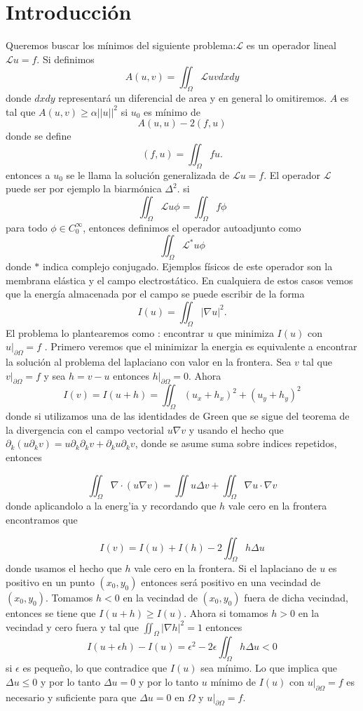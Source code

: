 \documentclass[a4paper,10pt]{book}
\begin{document}
\section{Introducci\'on}
Queremos buscar los m\'inimos del siguiente problema:$\mathscr{L}$ es un operador lineal
$\mathscr{L} u=f$.   Si definimos
\[A(u,v)=\iint_{\Omega} \mathscr{L} u v  dx dy \] 
donde $dx dy$ representar\'a un diferencial de area y en general lo omitiremos.
$A$ es tal que $A(u,v)\geq \alpha {|| u ||}^2$ si  $u_0$ es m\'inimo de 
\[A(u,u)-2 (f,u) \]
donde se define
\[(f,u)=\iint_{\Omega} f u .\]
entonces a $u_0$ se le llama la soluci\'on generalizada de $\mathscr{L} u=f$. El operador $\mathscr{L}$ puede ser 
por ejemplo la  biarm\'onica $\Delta^2$.
si
\[\iint_{\Omega} \mathscr{L} u\phi =\iint_{\Omega} f \phi  \]
para todo $\phi \in C_0^\infty$, entonces definimos el operador autoadjunto como 
\[\iint_{\Omega} \mathscr{L}^{*} u\phi \]
donde $*$ indica complejo conjugado. Ejemplos f\'isicos de este operador son 
la membrana el\'astica y el campo electrost\'atico. En cualquiera de estos casos
vemos que la energ\'ia almacenada por el campo se puede escribir de la forma
\[I(u)=\iint_{\Omega} |\nabla u |^2  .\]
El problema lo plantearemos como : encontrar $u$  que minimiza $I(u)$ con $u|_{\partial \Omega}=f$ .
Primero veremos que el minimizar la energia es equivalente a encontrar la soluci\'on al problema 
del laplaciano con valor en la frontera. Sea $v$ tal que $v|_{\partial \Omega}=f$ y sea
$h=v-u$ entonces $h|_{\partial \Omega}=0$. Ahora
\[I(v)= I(u+h)=  \iint_{\Omega} (u_x +h_x)^2+(u_y+h_y)^2  \]
donde si utilizamos una de las identidades de Green que se sigue del teorema de la divergencia con 
el campo vectorial $u \nabla v $ y usando el hecho que $\partial_{k}(u\partial_k v)=u \partial _k \partial _k v+  \partial _k u \partial _k v$,
donde se asume  suma sobre indices repetidos, entonces

\[\iint_{\Omega} \nabla \cdot (u \nabla v)   =\iint u \Delta v + \iint_\Omega \nabla u\cdot\nabla v \]
donde  aplicandolo a la energ'ia y recordando que $h$ vale cero en la frontera encontramos que

\[I(v)=I(u)+I(h)-2\iint_{\Omega} h \Delta u  \] 
donde usamos el hecho que $h$ vale cero en la frontera. Si el laplaciano de $u$ es positivo en un punto $(x_0,y_0)$
entonces ser\'a positivo en una vecindad de $(x_0,y_0)$.  Tomamos $h<0$ en la vecindad de $(x_0,y_0)$
fuera de dicha vecindad, entonces se tiene que $I(u+h)\geq I(u)$. Ahora si tomamos
$h>0$ en la vecindad y cero fuera y tal que $\iint_{\Omega} |\nabla h|^2 =1$   entonces
\[I(u+\epsilon h)-I(u)= \epsilon^2-2\epsilon \iint_{\Omega} h \Delta u <0\]
si $ \epsilon$ es peque\~no, lo que contradice que $I(u)$ sea m\'inimo. Lo que implica que
$\Delta u\leq 0$ y por lo tanto $\Delta u=0$ y por lo tanto $u$ m\'inimo de $I(u)$  con $u|_{\partial \Omega} =f$ es necesario
y suficiente para que $\Delta u=0$ en $\Omega$ y $u|_{\partial \Omega}=f$.
\end{document}
